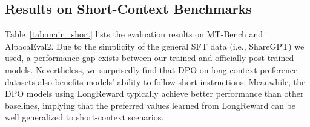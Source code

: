 \begin{table}[t]
\centering
{}
\caption{Performance of different models on short-context instruction-following benchmarks.}
\label{tab:main_short}
\end{table}\subsection{Results on Short-Context Benchmarks}
Table~\ref{tab:main_short} lists the evaluation results on MT-Bench and AlpacaEval2. Due to the simplicity of the general SFT data (i.e., ShareGPT) we used, a performance gap exists between our trained and officially post-trained models. Nevertheless, we surprisedly find that DPO on long-context preference datasets also benefits models' ability to follow short instructions. Meanwhile, the DPO models using LongReward typically achieve better performance than other baselines, implying that the preferred values learned from LongReward can be well generalized to short-context scenarios.

